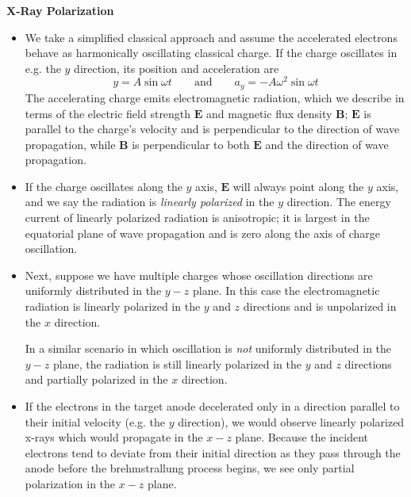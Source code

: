 \documentclass[11pt, a4paper]{article}
\newcommand{\eqtext}[1]{\qquad \text{#1} \qquad}
\begin{document}
\textbf{X-Ray Polarization}
\begin{itemize}
	\item We take a simplified classical approach and assume the accelerated electrons behave as harmonically oscillating classical charge. If the charge oscillates in e.g. the $ y $ direction, its position and acceleration are
	\begin{equation*}
		y = A \sin \omega t \eqtext{and} a_{y} = -A\omega^{2} \sin \omega t
	\end{equation*}
	The accelerating charge emits electromagnetic radiation, which we describe in terms of the electric field strength $ \bm{E} $ and magnetic flux density $ \bm{B} $; $ \bm{E} $ is parallel to the charge's velocity and is perpendicular to the direction of wave propagation, while $ \bm{B} $ is perpendicular to both $ \bm{E} $ and the direction of wave propagation.
	
	\item If the charge oscillates along the $ y $ axis, $ \bm{E} $ will always point along the $ y $ axis, and we say the radiation is \textit{linearly polarized} in the $ y $ direction. The energy current of linearly polarized radiation is anisotropic; it is largest in the equatorial plane of wave propagation and is zero along the axis of charge oscillation. 
	
	\item Next, suppose we have multiple charges whose oscillation directions are uniformly distributed in the $ y-z $  plane. In this case the electromagnetic radiation is linearly polarized in the $ y $ and $ z $ directions and is unpolarized in the $ x $ direction. 
	
	In a similar scenario in which oscillation is \textit{not} uniformly distributed in the $ y-z $ plane, the radiation is still linearly polarized in the $ y $ and $ z $ directions and partially polarized in the $ x $ direction. 
	
	\item If the electrons in the target anode decelerated only in a direction parallel to their initial velocity (e.g. the $ y $ direction), we would observe linearly polarized x-rays which would propagate in the $ x-z $ plane. Because the incident electrons tend to deviate from their initial direction as they pass through the anode before the brehmstrallung process begins, we see only partial polarization in the $ x-z $ plane.
	
\end{itemize}
\end{document}
